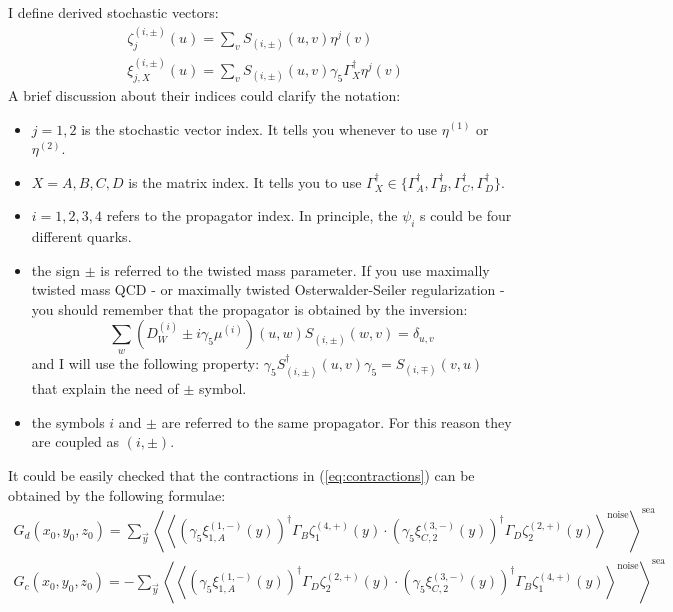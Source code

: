 \documentclass[11pt,a4paper]{article}
\begin{document}
I define derived stochastic vectors:
\begin{equation}
    \begin{aligned}
        & \zeta^{(i,\pm)}_{j} (u) = \sum_{v} S_{(i,\pm)}(u,v)\eta^{j}(v) \\
        & \xi^{(i,\pm)}_{j,X} (u) = \sum_{v} S_{(i,\pm)}(u,v) \gamma_5 \Gamma_X^\dag \eta^{j}(v)
    \end{aligned}
\end{equation}
A brief discussion about their indices could clarify the notation:
\begin{itemize}
    \item   $j=1,2$ is the stochastic vector index. It tells you whenever to use $\eta^{(1)}$ or $\eta^{(2)}$.
    \item   $X=A,B,C,D$ is the matrix index. It tells you to use $\Gamma_X^\dag \in \{\Gamma_A^\dag,\Gamma_B^\dag,\Gamma_C^\dag,\Gamma_D^\dag\}$.
    \item   $i=1,2,3,4$ refers to the propagator index. In principle, the $\psi_i$ s could be four different quarks.
    \item   the sign $\pm$ is referred to the twisted mass parameter. If you use maximally twisted mass QCD - or maximally twisted Osterwalder-Seiler regularization - you should remember that the propagator is obtained by the inversion:
               $$\sum_{w} \left(D_W^{(i)} \pm i\gamma_5\mu^{(i)}\right)(u,w) S_{(i,\pm)}(w,v) = \delta_{u,v}$$ 
            and I will use the following property: $\gamma_5 S_{(i,\pm)}^\dag(u,v) \gamma_5 = S_{(i,\mp)}(v,u)$ that explain the need of $\pm$ symbol.
    \item   the symbols $i$ and $\pm$ are referred to the same propagator. For this reason they are coupled as $(i,\pm)$.
\end{itemize}
It could be easily checked that the contractions in (\ref{eq:contractions}) can be obtained by the following formulae:
\begin{equation*}
    \begin{gathered}
        G_d(x_0,y_0,z_0) =   \sum_{\vec y} \left\langle \left\langle \left(\gamma_5\xi^{(1,-)}_{1,A} (y) \right)^\dag \Gamma_B \zeta^{(4,+)}_1 (y) \cdot \left(\gamma_5\xi^{(3,-)}_{C,2} (y) \right)^\dag \Gamma_D \zeta^{(2,+)}_2 (y) \right\rangle^\text{noise} \right\rangle^{\text{sea}} \\
        G_c(x_0,y_0,z_0) = - \sum_{\vec y} \left\langle \left\langle \left(\gamma_5\xi^{(1,-)}_{1,A} (y) \right)^\dag \Gamma_D \zeta^{(2,+)}_2 (y) \cdot \left(\gamma_5\xi^{(3,-)}_{C,2} (y) \right)^\dag \Gamma_B \zeta^{(4,+)}_1 (y) \right\rangle^\text{noise} \right\rangle^{\text{sea}}
    \end{gathered}
\end{equation*}
\end{document}
